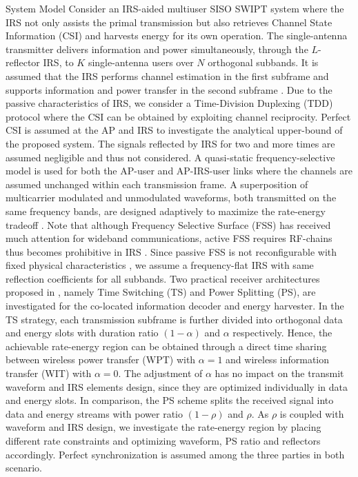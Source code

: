\documentclass{IEEEtran}
\begin{document}
\begin{section} {System Model}
	Consider an IRS-aided multiuser SISO SWIPT system where the IRS not only assists the primal transmission but also retrieves Channel State Information (CSI) and harvests energy for its own operation. The single-antenna transmitter delivers information and power simultaneously, through the $L$-reflector IRS, to $K$ single-antenna users over $N$ orthogonal subbands. It is assumed that the IRS performs channel estimation in the first subframe and supports information and power transfer in the second subframe \cite{Zheng2019}. Due to the passive characteristics of IRS, we consider a Time-Division Duplexing (TDD) protocol where the CSI can be obtained by exploiting channel reciprocity. Perfect CSI is assumed at the AP and IRS to investigate the analytical upper-bound of the proposed system. The signals reflected by IRS for two and more times are assumed negligible and thus not considered. A quasi-static frequency-selective model is used for both the AP-user and AP-IRS-user links where the channels are assumed unchanged within each transmission frame. A superposition of multicarrier modulated and unmodulated waveforms, both transmitted on the same frequency bands, are designed adaptively to maximize the rate-energy tradeoff \cite{Clerckx2018b}. Note that although Frequency Selective Surface (FSS) has received much attention for wideband communications, active FSS requires RF-chains thus becomes prohibitive in IRS \cite{Kim2006,Xu2014}. Since passive FSS is not reconfigurable with fixed physical characteristics \cite{Anwar2018}, we assume a frequency-flat IRS with same reflection coefficients for all subbands. Two practical receiver architectures proposed in \cite{Zhang2013}, namely Time Switching (TS) and Power Splitting (PS), are investigated for the co-located information decoder and energy harvester. In the TS strategy, each transmission subframe is further divided into orthogonal data and energy slots with duration ratio $(1 - \alpha)$ and $\alpha$ respectively. Hence, the achievable rate-energy region can be obtained through a direct time sharing between wireless power transfer (WPT) with $\alpha=1$ and wireless information transfer (WIT) with $\alpha=0$. The adjustment of $\alpha$ has no impact on the transmit waveform and IRS elements design, since they are optimized individually in data and energy slots. In comparison, the PS scheme splits the received signal into data and energy streams with power ratio $(1 - \rho)$ and $\rho$. As $\rho$ is coupled with waveform and IRS design, we investigate the rate-energy region by placing different rate constraints and optimizing waveform, PS ratio and reflectors accordingly. Perfect synchronization is assumed among the three parties in both scenario.


\end{section}
\end{document}
